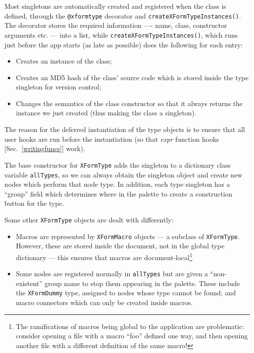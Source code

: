 Most singletons are automatically created and registered when the class
is defined, through the \texttt{@xformtype} decorator and \texttt{createXFormTypeInstances()}. 
The decorator stores the required information ---- name, class, constructor arguments etc. ---
into a list, while \texttt{createXFormTypeInstances()}, which runs just before the app starts (as
late as possible) does the following for each entry:
\begin{itemize}
\item Creates an instance of the class;
\item Creates an MD5 hash of the class' source code which is stored
inside the type singleton for version control;
\item Changes the semantics of the class constructor so that
it always returns the instance we just created (thus making the class
a singleton).
\end{itemize}
The reason for the deferred instantiation of the type objects is to ensure that all user
hooks are run before the instantiation (so that \emph{expr} function hooks [Sec.~\ref{writingfuncs}]
work).

The base constructor for \texttt{XFormType} adds the singleton
to a dictionary class variable \texttt{allTypes}, so we can always
obtain the singleton object and create new nodes which perform that
node type. In addition, each type singleton has a ``group'' field which 
determines where in the palette to create a construction button for the type.

Some other \texttt{XFormType} objects are dealt with differently:
\begin{itemize}
\item Macros are represented by \texttt{XFormMacro} objects --- a subclass
of \texttt{XFormType}. However, these
are stored inside the document, not in the global type
dictionary --- this ensures that macros are document-local\footnote{The
ramifications of macros being global to the application are problematic:
consider opening a file with a macro ``foo'' defined one way, and then
opening another file with a different definition of the same macro!}
\item Some nodes are registered normally in \texttt{allTypes} but are given
a ``non-existent'' group name to stop them appearing in the palette.
These include the \texttt{XFormDummy} type, assigned to nodes whose
type cannot be found; and macro connectors which can only be created inside
macros.
\end{itemize}


